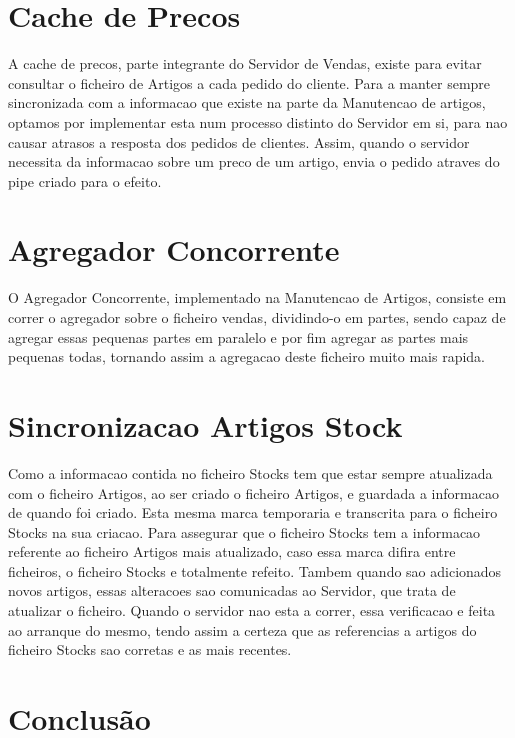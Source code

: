 \documentclass[a4paper]{report}
\begin{document}
\chapter{Cache de Precos}

A cache de precos, parte integrante do Servidor de Vendas, existe para
evitar consultar o ficheiro de Artigos a cada pedido do cliente.
Para a manter sempre sincronizada com a informacao que existe na parte da
Manutencao de artigos, optamos por implementar esta num processo distinto
do Servidor em si, para nao causar atrasos a resposta dos pedidos de clientes.
Assim, quando o servidor necessita da informacao sobre um preco de um artigo,
envia o pedido atraves do pipe criado para o efeito.

\chapter{Agregador Concorrente}

O Agregador Concorrente, implementado na Manutencao de Artigos, consiste
em correr o agregador sobre o ficheiro vendas, dividindo-o em partes, sendo
capaz de agregar essas pequenas partes em paralelo e por fim agregar as 
partes mais pequenas todas, tornando assim a agregacao deste ficheiro muito
mais rapida.

\chapter{Sincronizacao Artigos Stock}

Como a informacao contida no ficheiro Stocks tem que estar sempre atualizada
com o ficheiro Artigos, ao ser criado o ficheiro Artigos, e guardada a 
informacao de quando foi criado. Esta mesma marca temporaria e transcrita para
o ficheiro Stocks na sua criacao. Para assegurar que o ficheiro Stocks
tem a informacao referente ao ficheiro Artigos mais atualizado, caso essa marca
difira entre ficheiros, o ficheiro Stocks e totalmente refeito. Tambem quando sao
adicionados novos artigos, essas alteracoes sao comunicadas ao Servidor, que trata
de atualizar o ficheiro. Quando o servidor nao esta a correr, essa verificacao
e feita ao arranque do mesmo, tendo assim a certeza que as referencias a artigos
do ficheiro Stocks sao corretas e as mais recentes.

\chapter{Conclusão}
\end{document}

